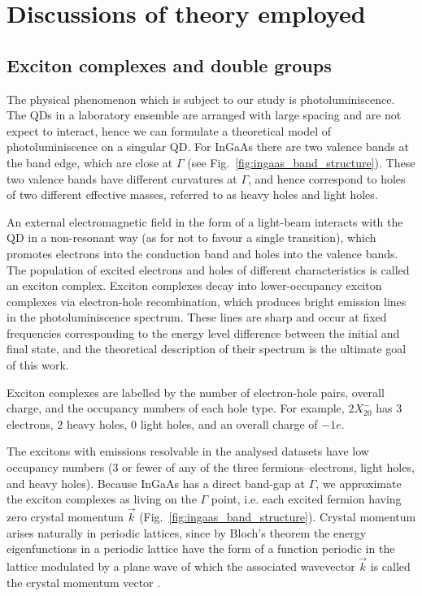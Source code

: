 \section{Discussions of theory employed}

\subsection[Exciton complexes]{Exciton complexes and double groups} \label{sec:exciton_theory}
The physical phenomenon which is subject to our study is photoluminiscence. The QDs in a laboratory ensemble are arranged with large spacing and are not expect to interact, hence we can formulate a theoretical model of photoluminiscence on a singular QD. For InGaAs there are two valence bands at the band edge, which are close at $\Gamma$ (see Fig.~\ref{fig:ingaas_band_structure}). These two valence bands have different curvatures at $\Gamma$, and hence correspond to holes of two different effective masses, referred to as heavy holes and light holes.

An external electromagnetic field in the form of a light-beam interacts with the QD in a non-resonant way (as for not to favour a single transition), which promotes electrons into the conduction band and holes into the valence bands. The population of excited electrons and holes of different characteristics is called an exciton complex. Exciton complexes decay into lower-occupancy exciton complexes via electron-hole recombination, which produces bright emission lines in the photoluminiscence spectrum. These lines are sharp and occur at fixed frequencies corresponding to the energy level difference between the initial and final state, and the theoretical description of their spectrum is the ultimate goal of this work.

Exciton complexes are labelled by the number of electron-hole pairs, overall charge, and the occupancy numbers of each hole type. For example, $2X^-_{20}$ has $3$ electrons, $2$ heavy holes, $0$ light holes, and an overall charge of $-1e$.

The excitons with emissions resolvable in the analysed datasets have low occupancy numbers (3 or fewer of any of the three fermions--electrons, light holes, and heavy holes). Because InGaAs has a direct band-gap at $\Gamma$, we approximate the exciton complexes as living on the $\Gamma$ point, i.e. each excited fermion having zero crystal momentum $\vec{k}$ (Fig.~\ref{fig:ingaas_band_structure}). Crystal momentum arises naturally in periodic lattices, since by Bloch's theorem the energy eigenfunctions in a periodic lattice have the form of a function periodic in the lattice modulated by a plane wave of which the associated wavevector $\vec{k}$ is called the crystal momentum vector \cite[Ch.~2.2]{singh}.

